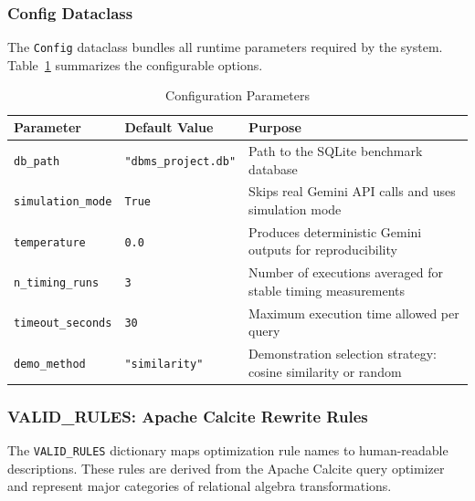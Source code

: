 \documentclass[12pt,a4paper]{article}
\begin{document}
\subsubsection{Config Dataclass}

The \texttt{Config} dataclass bundles all runtime parameters required by the system. Table~\ref{tab:config_params} summarizes the configurable options.

\begin{table}[h]
\centering
\caption{Configuration Parameters}
\label{tab:config_params}
\begin{tabular}{|l|l|p{7cm}|}
\hline
\textbf{Parameter} & \textbf{Default Value} & \textbf{Purpose} \\
\hline
\texttt{db\_path} & \texttt{"dbms\_project.db"} & Path to the SQLite benchmark database \\
\hline
\texttt{simulation\_mode} & \texttt{True} & Skips real Gemini API calls and uses simulation mode \\
\hline
\texttt{temperature} & \texttt{0.0} & Produces deterministic Gemini outputs for reproducibility \\
\hline
\texttt{n\_timing\_runs} & \texttt{3} & Number of executions averaged for stable timing measurements \\
\hline
\texttt{timeout\_seconds} & \texttt{30} & Maximum execution time allowed per query \\
\hline
\texttt{demo\_method} & \texttt{"similarity"} & Demonstration selection strategy: cosine similarity or random \\
\hline
\end{tabular}
\end{table}

\subsubsection{VALID\_RULES: Apache Calcite Rewrite Rules}

The \texttt{VALID\_RULES} dictionary maps optimization rule names to human-readable descriptions. These rules are derived from the Apache Calcite query optimizer and represent major categories of relational algebra transformations.
\end{document}

